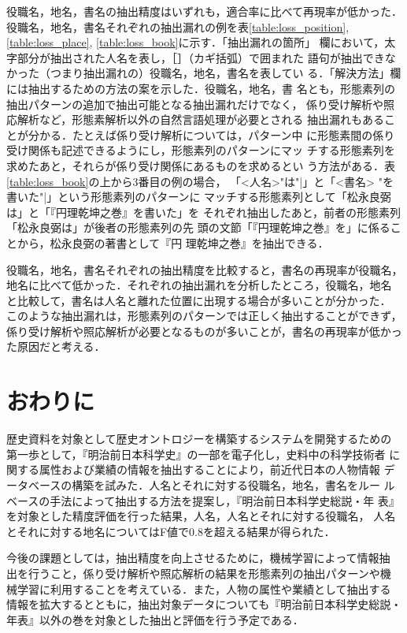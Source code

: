 \documentclass[japanese]{jnlp_1.4}
\def\|{}
\begin{document}
役職名，地名，書名の抽出精度はいずれも，適合率に比べて再現率が低かった．
役職名，地名，書名それぞれの抽出漏れの例を表\ref{table:loss_position},
\ref{table:loss_place}, \ref{table:loss_book}に示す．「抽出漏れの箇所」
欄において，太字部分が抽出された人名を表し，［］（カギ括弧）で囲まれた
語句が抽出できなかった（つまり抽出漏れの）役職名，地名，書名を表してい
る．「解決方法」欄には抽出するための方法の案を示した．役職名，地名，書
名とも，形態素列の抽出パターンの追加で抽出可能となる抽出漏れだけでなく，
係り受け解析や照応解析など，形態素解析以外の自然言語処理が必要とされる
抽出漏れもあることが分かる．たとえば係り受け解析については，パターン中
に形態素間の係り受け関係も記述できるようにし，形態素列のパターンにマッ
チする形態素列を求めたあと，それらが係り受け関係にあるものを求めるとい
う方法がある．表\ref{table:loss_book}の上から3番目の例の場合，
「\|<人名>"は"|」と「\|<書名> "を書いた"|」という形態素列のパターンに
マッチする形態素列として「松永良弼は」と「『円理乾坤之巻』を書いた」を
それぞれ抽出したあと，前者の形態素列「松永良弼は」が後者の形態素列の先
頭の文節「『円理乾坤之巻』を」に係ることから，松永良弼の著書として『円
理乾坤之巻』を抽出できる．

役職名，地名，書名それぞれの抽出精度を比較すると，書名の再現率が役職名，
地名に比べて低かった．それぞれの抽出漏れを分析したところ，役職名，地名
と比較して，書名は人名と離れた位置に出現する場合が多いことが分かった．
このような抽出漏れは，形態素列のパターンでは正しく抽出することができず，
係り受け解析や照応解析が必要となるものが多いことが，書名の再現率が低かっ
た原因だと考える．



\section{おわりに}

歴史資料を対象として歴史オントロジーを構築するシステムを開発するための
第一歩として，『明治前日本科学史』の一部を電子化し，史料中の科学技術者
に関する属性および業績の情報を抽出することにより，前近代日本の人物情報
データベースの構築を試みた．人名とそれに対する役職名，地名，書名をルー
ルベースの手法によって抽出する方法を提案し，『明治前日本科学史総説・年
表』を対象とした精度評価を行った結果，人名，人名とそれに対する役職名，
人名とそれに対する地名についてはF値で0.8を超える結果が得られた．

今後の課題としては，抽出精度を向上させるために，機械学習によって情報抽
出を行うこと，係り受け解析や照応解析の結果を形態素列の抽出パターンや機
械学習に利用することを考えている．また，人物の属性や業績として抽出する
情報を拡大するとともに，抽出対象データについても『明治前日本科学史総説・
年表』以外の巻を対象とした抽出と評価を行う予定である．
\end{document}
